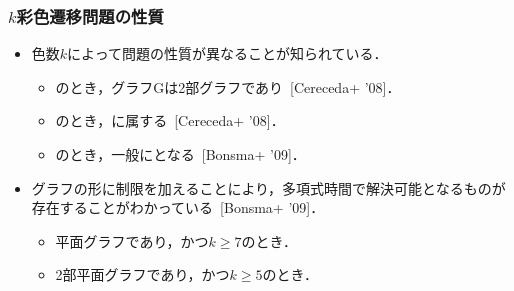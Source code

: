 \begin{frame}\frametitle{$k$彩色遷移問題の性質}

  \begin{itemize}
    \item 色数$k$によって問題の性質が異なることが知られている．
    \begin{itemize}
      \item {}のとき，グラフGは2部グラフであり~[Cereceda+ '08]．
      \item {}のとき，に属する~[Cereceda+ '08]．
      \item {}のとき，一般にとなる~[Bonsma+ '09]．
    \end{itemize}

    \item グラフの形に制限を加えることにより，多項式時間で解決可能となるものが存在することがわかっている~[Bonsma+ '09]．
    \begin{itemize}
      \item 平面グラフであり，かつ$k \ge 7$のとき．
      \item 2部平面グラフであり，かつ$k \ge 5$のとき．
    \end{itemize}

  \end{itemize}

\end{frame}

%
%  

\backupend